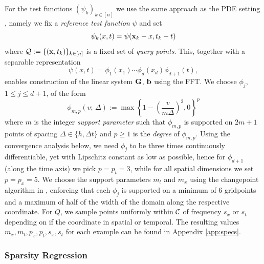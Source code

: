 \documentclass[english,reqno]{amsart}
\begin{document}
For the test functions $(\psi_k)_{k\in[n]}$ we use the same approach as the PDE setting \cite{messenger2020weakpde}, namely we fix a {\it reference test function} $\psi$ and set 
\[\psi_k(x,t) = \psi(\mathbf{x}_k-x,t_k-t)\]
where ${\mathcal{Q}}:=\{(\mathbf{x},t_k)\}_{k\in[n]}$ is a fixed set of {\it query points}. This, together with a separable representation
\[\psi(x,t) = \phi_1(x_1)\cdots\phi_d(x_d)\phi_{d+1}(t),\]
enables construction of the linear system $\mathbf{G}$, $\mathbf{b}$ using the FFT. We choose $\phi_j$, $1\leq j\leq d+1$, of the form 
\begin{equation}\label{testfcn}
\phi_{m,p}(v;\, \Delta) := \max\left\{1-\left(\frac{v}{m\Delta}\right)^2,0\right\}^{p}
\end{equation}
where $m$ is the integer {\it support parameter}  such that $\phi_{m,p}$ is supported on $2m+1$ points of spacing $\Delta\in\{h, \Delta t\}$ and $p\geq 1$ is the {\it degree} of $\phi_{m,p}$. Using the convergence analysis below, we need $\phi_j$ to be three times continuously differentiable, yet with Lipschitz constant as low as possible, hence for $\phi_{d+1}$ (along the time axis) we pick $p=p_t=3$, while for all spatial dimensions we set $p=p_x=5$. We choose the support parameters $m_t$ and $m_x$ using the changepoint algorithm in \cite[Appendix A]{messenger2020weakpde}, enforcing that each $\phi_j$ is supported on a minimum of 6 gridpoints and a maximum of half of the width of the domain along the respective coordinate. For $Q$, we sample points uniformly within ${\mathcal{C}}$ of frequency $s_x$ or $s_t$ depending on if the coordinate in spatial or temporal. The resulting values $m_x,m_t,p_x,p_t,s_x,s_t$ for each example can be found in Appendix \ref{app:specs}.

\subsubsection{Sparsity Regression}
\end{document}
